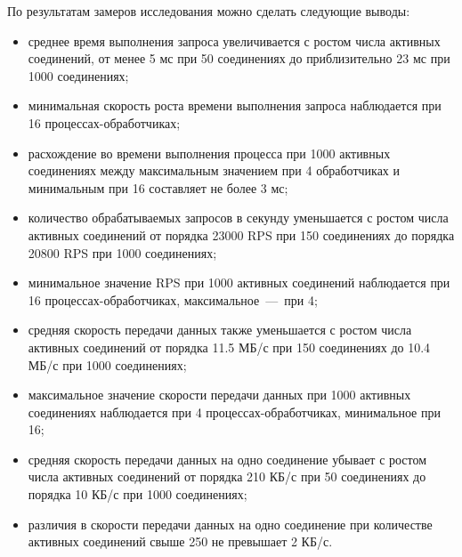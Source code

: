 По результатам замеров исследования можно сделать следующие выводы:
\begin{itemize}
	\item среднее время выполнения запроса увеличивается с ростом числа активных соединений, от менее 5 мс при 50 соединениях до приблизительно 23 мс при 1000 соединениях;
	\item минимальная скорость роста времени выполнения запроса наблюдается при 16 процессах-обработчиках;
	\item расхождение во времени выполнения процесса при 1000 активных соединениях между максимальным значением при 4 обработчиках и минимальным при 16 составляет не более 3 мс;
	\item количество обрабатываемых запросов в секунду уменьшается с ростом числа активных соединений от порядка 23000 RPS при 150 соединениях до порядка 20800 RPS при 1000 соединениях;
	\item минимальное значение RPS при 1000 активных соединений наблюдается при 16 процессах-обработчиках, максимальное~---~при 4;
	\item средняя скорость передачи данных также уменьшается с ростом числа активных соединений от порядка 11.5 МБ/с при 150 соединениях до 10.4 МБ/с при 1000 соединениях;
	\item максимальное значение скорости передачи данных при 1000 активных соединениях наблюдается при 4 процессах-обработчиках, минимальное при 16;
	\item средняя скорость передачи данных на одно соединение убывает с ростом числа активных соединений от порядка 210 КБ/с при 50 соединениях до порядка 10 КБ/с при 1000 соединениях;
	\item различия в скорости передачи данных на одно соединение при количестве активных соединений свыше 250 не превышает 2 КБ/с.
\end{itemize}


\clearpage